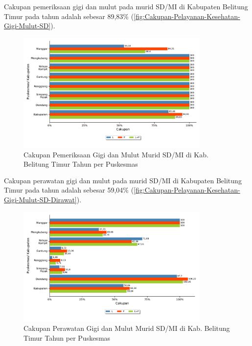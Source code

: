 Cakupan pemeriksaan gigi dan mulut pada murid SD/MI di Kabupaten Belitung Timur pada tahun \tP adalah sebesar 89,83\% (\autoref{fig:Cakupan-Pelayanan-Kesehatan-Gigi-Mulut-SD}).

\begin{figure}[H]
	\centering
	\includegraphics[width=0.85\textwidth]{bab_05/bab_05_27c_gimulSDdiperiksa}
	\caption{Cakupan Pemeriksaan Gigi dan Mulut Murid SD/MI di Kab. Belitung Timur Tahun \tP per Puskesmas}
	\label{fig:Cakupan-Pelayanan-Kesehatan-Gigi-Mulut-SD}
\end{figure}

Cakupan perawatan gigi dan mulut pada murid SD/MI di Kabupaten Belitung Timur pada tahun \tP adalah sebesar 59,04\% (\autoref{fig:Cakupan-Pelayanan-Kesehatan-Gigi-Mulut-SD-Dirawat}).

\begin{figure}[H]
	\centering
	\includegraphics[width=0.85\textwidth]{bab_05/bab_05_27d_gimulSDdirawat}
	\caption{Cakupan Perawatan Gigi dan Mulut Murid SD/MI di Kab. Belitung Timur Tahun \tP per Puskesmas}
	\label{fig:Cakupan-Pelayanan-Kesehatan-Gigi-Mulut-SD-Dirawat}
\end{figure}

